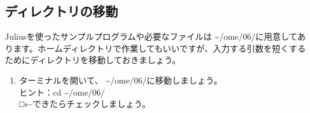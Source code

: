 \subsection{ディレクトリの移動}
Juliusを使ったサンプルプログラムや必要なファイルは \textasciitilde /ome/06/に用意してあります。ホームディレクトリで作業してもいいですが、入力する引数を短くするためにディレクトリを移動しておきましょう。\\

\begin{tcolorbox}[title=\useOmetoi]
\begin{enumerate}
\item ターミナルを開いて、 \textasciitilde /ome/06/に移動しましょう。\\ヒント：cd  \textasciitilde /ome/06/\\□←できたらチェックしましょう。
\end{enumerate}
\end{tcolorbox}
